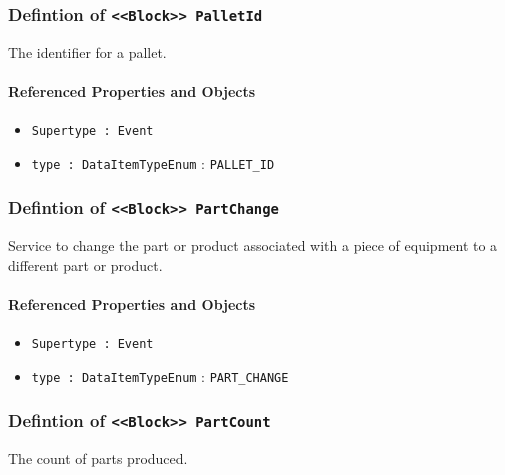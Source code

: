 \subsubsection{Defintion of \texttt{<<Block>> PalletId}}
  \label{type:PalletId}

\FloatBarrier

The identifier for a pallet.

\FloatBarrier
\paragraph{Referenced Properties and Objects}

\begin{itemize}
\item \texttt{Supertype : Event}

\item \texttt{type : DataItemTypeEnum} : \texttt{PALLET_ID}

\end{itemize}
\FloatBarrier
\subsubsection{Defintion of \texttt{<<Block>> PartChange}}
  \label{type:PartChange}

\FloatBarrier

Service to change the part or product associated with a piece of equipment to a different part or product.

\FloatBarrier
\paragraph{Referenced Properties and Objects}

\begin{itemize}
\item \texttt{Supertype : Event}

\item \texttt{type : DataItemTypeEnum} : \texttt{PART_CHANGE}

\end{itemize}
\FloatBarrier
\subsubsection{Defintion of \texttt{<<Block>> PartCount}}
  \label{type:PartCount}

\FloatBarrier

The count of parts produced.

\FloatBarrier
